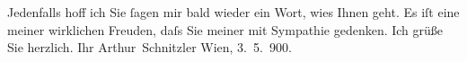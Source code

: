 \pstart
           Jedenfalls hoff ich Sie{ }ſagen mir bald wieder ein Wort, wies Ihnen {\pb}geht. Es iſt eine meiner wirklichen Freuden, daſs
               Sie meiner mit Sympathie gedenken. Ich grüße Sie herzlich.\pend
           \pstart Ihr \spacefill\mbox{Arthur Schnitzler}\pend{}
\pstart
           Wien, 3. 5. 900.\pend
           \endnumbering{}  \newcommand{\dateiname}{L01034}\newcommand{\titel}{Arthur Schnitzler an Georg Brandes, 3. 5. 1900}\newcommand{\editorInnen}{Martin Anton Müller und Gerd-Hermann Susen}
